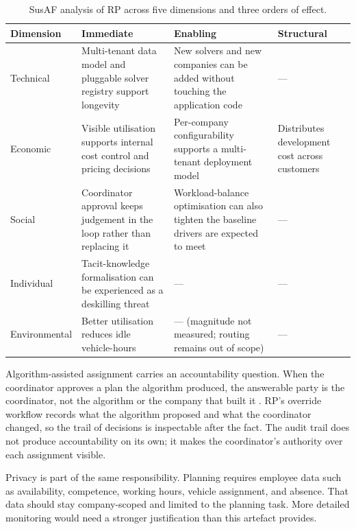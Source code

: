 \begin{table}[h]
\centering
\caption{SusAF analysis of RP across five dimensions and three orders of effect.}
\label{tab:susaf}
\small
\begin{tabular}{p{}p{}p{}p{}}
\toprule
\textbf{Dimension} & \textbf{Immediate} & \textbf{Enabling} & \textbf{Structural} \\
\midrule
Technical      & Multi-tenant data model and pluggable solver registry support longevity            & New solvers and new companies can be added without touching the application code & --- \\
Economic       & Visible utilisation supports internal cost control and pricing decisions            & Per-company configurability supports a multi-tenant deployment model             & Distributes development cost across customers \\
Social         & Coordinator approval keeps judgement in the loop rather than replacing it           & Workload-balance optimisation can also tighten the baseline drivers are expected to meet & --- \\
Individual     & Tacit-knowledge formalisation can be experienced as a deskilling threat             & ---                                                                              & --- \\
Environmental  & Better utilisation reduces idle vehicle-hours                                       & --- (magnitude not measured; routing remains out of scope)                       & --- \\
\bottomrule
\end{tabular}
\end{table}

Algorithm-assisted assignment carries an accountability question. When the coordinator approves a plan the algorithm produced, the answerable party is the coordinator, not the algorithm or the company that built it \parencite{martin2019accountability}. RP's override workflow records what the algorithm proposed and what the coordinator changed, so the trail of decisions is inspectable after the fact. The audit trail does not produce accountability on its own; it makes the coordinator's authority over each assignment visible.

Privacy is part of the same responsibility. Planning requires employee data such as availability, competence, working hours, vehicle assignment, and absence. That data should stay company-scoped and limited to the planning task. More detailed monitoring would need a stronger justification than this artefact provides.


